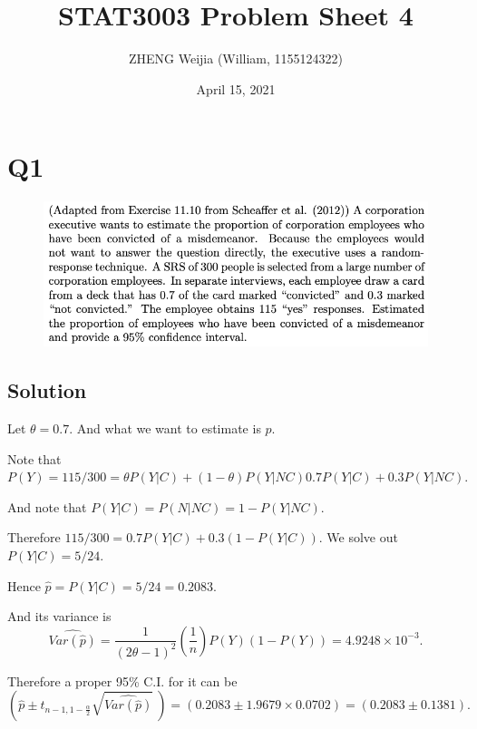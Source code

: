 \documentclass[12pt]{article}%
\begin{document}
\title{STAT3003 Problem Sheet 4}
\author{ZHENG Weijia (William, 1155124322)}
\date{April 15, 2021}
\maketitle


\section{Q1}
\begin{figure}[htp]
    \includegraphics[width = 16cm]{img/Q1.png}
\end{figure}

\subsection*{Solution}

Let $\theta=0.7.$ And what we want to estimate is $p.$

Note that $P(Y)=115/300=\theta P(Y|C)+(1-\theta) P(Y|NC)
0.7 P(Y|C)+0.3 P(Y|NC).$

And note that $P(Y|C)=P(N|NC)=1-P(Y|NC).$

Therefore $115/300 = 0.7 P(Y|C) + 0.3 (1-P(Y|C)).$ We solve out 
$P(Y|C)=5/24.$

Hence $\hat{p}=P(Y|C)=5/24=0.2083.$

And its variance is 
$$\widehat{Var(\hat{p})}=\frac{1}{(2\theta -1)^2}(\frac{1}{n})P(Y)(1-P(Y))=4.9248\times 10^{-3}.$$

Therefore a proper 95\% C.I. for it can be 
$$(\hat{p} \pm t_{n-1,1-\frac{\alpha}{2}} \sqrt{\widehat{Var(\hat{p})}}~)=(0.2083 \pm 1.9679 \times 0.0702)=(0.2083 \pm 0.1381).$$


\newpage
\end{document}
